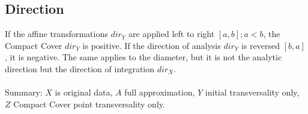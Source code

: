 \documentclass{report}
\begin{document}
\subsection*{Direction}
If the affine transformations $dir_{Y}$ are applied left to right $[a,b];a<b$, the Compact Cover $dir_{Y}$ is positive. If the direction of analysis $dir_{Y}$ is reversed $[b,a]$, it is negative. The same applies to the diameter, but it is not the analytic direction but the direction of integration $dir_{X}$.\\\\
Summary: $X$ is original data, $A$ full approximation, $Y$ initial transversality only, $Z$ Compact Cover point transversality only.

\iffalse
\printbibliography
\fi
{}

\end{document}
